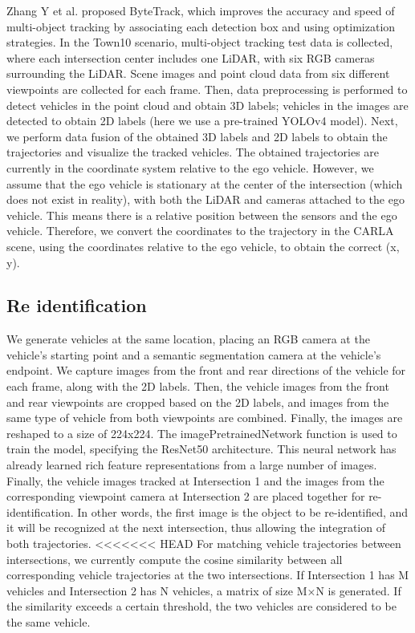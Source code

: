 Zhang Y et al. proposed ByteTrack, which improves the accuracy and speed of multi-object tracking by associating each detection box and using optimization strategies.\cite{Alpher22b}
In the Town10 scenario, multi-object tracking test data is collected, where each intersection center includes one LiDAR, with six RGB cameras surrounding the LiDAR. Scene images and point cloud data from six different viewpoints are collected for each frame.
Then, data preprocessing is performed to detect vehicles in the point cloud and obtain 3D labels; vehicles in the images are detected to obtain 2D labels (here we use a pre-trained YOLOv4 model).
Next, we perform data fusion of the obtained 3D labels and 2D labels to obtain the trajectories and visualize the tracked vehicles.
The obtained trajectories are currently in the coordinate system relative to the ego vehicle. However, we assume that the ego vehicle is stationary at the center of the intersection (which does not exist in reality), with both the LiDAR and cameras attached to the ego vehicle. This means there is a relative position between the sensors and the ego vehicle. Therefore, we convert the coordinates to the trajectory in the CARLA scene, using the coordinates relative to the ego vehicle, to obtain the correct (x, y).

\subsection{Re identification}

We generate vehicles at the same location, placing an RGB camera at the vehicle's starting point and a semantic segmentation camera at the vehicle's endpoint. We capture images from the front and rear directions of the vehicle for each frame, along with the 2D labels.
Then, the vehicle images from the front and rear viewpoints are cropped based on the 2D labels, and images from the same type of vehicle from both viewpoints are combined. Finally, the images are reshaped to a size of 224x224.
The imagePretrainedNetwork function is used to train the model, specifying the ResNet50 architecture. This neural network has already learned rich feature representations from a large number of images.
Finally, the vehicle images tracked at Intersection 1 and the images from the corresponding viewpoint camera at Intersection 2 are placed together for re-identification. In other words, the first image is the object to be re-identified, and it will be recognized at the next intersection, thus allowing the integration of both trajectories.
<<<<<<< HEAD
For matching vehicle trajectories between intersections, we currently compute the cosine similarity between all corresponding vehicle trajectories at the two intersections. If Intersection 1 has M vehicles and Intersection 2 has N vehicles, a matrix of size M×N is generated. If the similarity exceeds a certain threshold, the two vehicles are considered to be the same vehicle.

